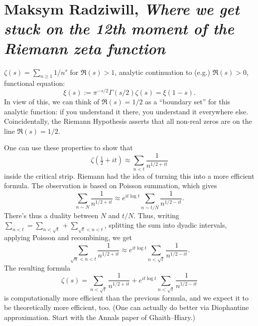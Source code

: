 \documentclass[reqno]{amsart} 
\numberwithin{theorem}{section}
\numberwithin{equation}{section}
\begin{document}
\section{Maksym Radziwill, \textnormal{\emph{Where we get stuck on the 12th moment of the Riemann zeta function}}}

$\zeta(s) = \sum_{n \geq 1}1 / n^s$ for $\Re(s) > 1$, analytic continuation to (e.g.) $\Re(s) > 0$, functional equation:
\begin{equation*}
  \xi(s) := \pi^{- s/2} \Gamma(s/2) \zeta(s) = \xi(1 - s).
\end{equation*}
In view of this, we can think of $\Re(s) = 1/2$ as a  ``boundary set'' for this analytic function: if you understand it there, you understand it everywhere else.  Coincidentally, the Riemann Hypothesis asserts that all non-real zeros are on the line $\Re(s) = 1/2$.

One can use these properties to show that
\begin{equation*}
  \zeta(\tfrac{1}{2} + i t) \approx \sum_{n < t} \frac{1}{n^{1/2 + i t}}
\end{equation*}
inside the critical strip.  Riemann had the idea of turning this into a more efficient formula.  The observation is based on Poisson summation, which gives
\begin{equation*}
  \sum_{n \sim N}
  \frac{1}{n^{1/2 + i t}}
  \approx e^{i t \log t}
  \sum_{n \sim t / N}
  \frac{1}{n^{1/2 - i t}}.
\end{equation*}
There's thus a duality between $N$ and $t /N$.  Thus, writing $\sum_{n < t} = \sum_{n < \sqrt{t}} + \sum_{\sqrt{t} < n < t}$, splitting the sum into dyadic intervals, applying Poisson and recombining, we get
\begin{equation*}
  \sum_{\sqrt{n} < n < t} \frac{1}{n^{1/2 + i t}} \approx e^{i t \log t} \sum_{n < \sqrt{t}} \frac{1}{n^{1/2 - i t}}.
\end{equation*}
The resulting formula
\begin{equation*}
  \zeta(s) = \sum_{n < \sqrt{t}} \frac{1}{n^{1/2 + i t}} + e^{i t \log t}
  \sum_{n < \sqrt{t}} \frac{1}{n^{1/2 - i t}}
\end{equation*}
is computationally more efficient than the previous formula, and we expect it to be theoretically more efficient, too.  (One can actually do better via Diophantine approximation.  Start with the Annals paper of Ghaith--Hiary.)
\end{document}

